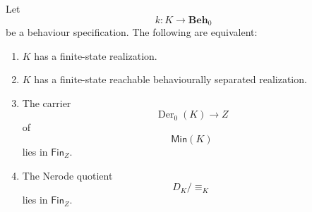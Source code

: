 \begin{corollary}
\label{cor:finite-state-myhill-nerode}
    Let
    \[
        k:K\to\mathbf{Beh}_0
    \]
    be a behaviour specification. The following are equivalent:
    \begin{enumerate}
        \item \(K\) has a finite-state realization.

        \item \(K\) has a finite-state reachable behaviourally separated realization.

        \item The carrier
        \[
            \operatorname{Der}_0(K)\to Z
        \]
        of
        \[
            \mathsf{Min}(K)
        \]
        lies in \(\mathsf{Fin}_Z\).

        \item The Nerode quotient
        \[
            D_K/{\equiv_K}
        \]
        lies in \(\mathsf{Fin}_Z\).
    \end{enumerate}
\end{corollary}
